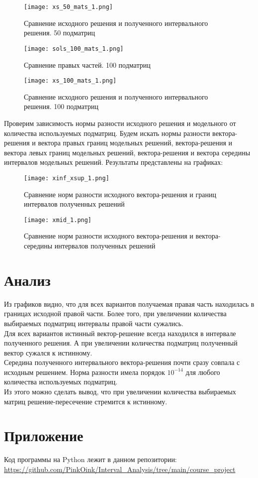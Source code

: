 \begin{figure}[h]
	\centering
	\texttt{[image: xs\_50\_mats\_1.png]}
	\caption{Сравнение исходного решения и полученного интервального решения. 50 подматриц}
\end{figure}
\newpage
\begin{figure}[h]
	\centering
	\texttt{[image: sols\_100\_mats\_1.png]}
	\caption{Сравнение правых частей. 100 подматриц}
\end{figure}

\begin{figure}[h]
	\centering
	\texttt{[image: xs\_100\_mats\_1.png]}
	\caption{Сравнение исходного решения и полученного интервального решения. 100 подматриц}
\end{figure}
\newpage

Проверим зависимость нормы разности исходного решения и модельного от количества используемых подматриц. Будем искать нормы разности вектора-решения и вектора правых границ модельных решений, вектора-решения и вектора левых границ модельных решений, вектора-решения и вектора середины интервалов модельных решений. Результаты представлены на графиках:
\begin{figure}[h]
	\centering
	\texttt{[image: xinf\_xsup\_1.png]}
	\caption{Сравнение норм разности исходного вектора-решения и границ интервалов полученных решений}
\end{figure}

\begin{figure}[h]
	\centering
	\texttt{[image: xmid\_1.png]}
	\caption{Сравнение норм разности исходного вектора-решения и вектора-середины интервалов полученных решений}
\end{figure}
\newpage


\section{Анализ}
Из графиков видно, что для всех вариантов получаемая правая часть находилась в границах исходной правой части. Более того, при увеличении количества выбираемых подматриц интервалы правой части сужались. \\

Для всех вариантов истинный вектор-решение всегда находился в интервале полученного решения. А при увеличении количества подматриц полученный вектор сужался к истинному. \\

Середина полученного интервального вектора-решения почти сразу совпала с исходным решением. Норма разности имела порядок $10^{-14}$ для любого количества используемых подматриц. \\

Из этого можно сделать вывод, что при увеличении количества выбираемых матриц решение-пересечение стремится к истинному.



\section{Приложение}
Код программы на Python лежит в данном репозитории: \\
\url{https://github.com/PinkOink/Interval_Analysis/tree/main/course_project}{}



